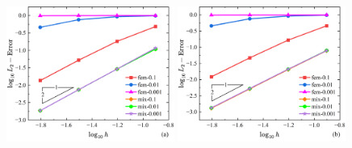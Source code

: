 \begin{figure}[H]
    \centering
    \begin{subcaptiongroup}
    \includegraphics[width=0.49\textwidth]{figures/shearlocking/T3-l2-h.png}
    \label{T3-l2-h}
    \includegraphics[width=0.49\textwidth]{figures/shearlocking/Q4-l2-h.png}
    \label{Q4-l2-h}
    \end{subcaptiongroup}
\caption{}
\label{linear-l2}
\end{figure}

